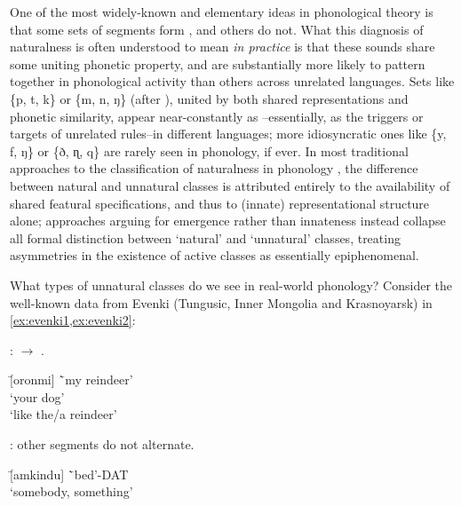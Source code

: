 One of the most widely-known and elementary ideas in phonological theory is that some sets of segments form , and others do not. What this diagnosis of naturalness is often understood to mean \emph{in practice} is that these sounds share some uniting phonetic property, and are substantially more likely to pattern together in phonological activity than others across unrelated languages. Sets like \{p, t, k\} or \{m, n, ŋ\} (after \cite{Kenstowicz1979}), united by both shared representations and phonetic similarity, appear near-constantly as --essentially, as the triggers or targets of unrelated rules--in different languages; more idiosyncratic ones like \{y, f, ŋ\} or \{ð, ɳ, q\} are rarely seen in phonology, if ever. In most traditional approaches to the classification of naturalness in phonology \citep{SPE}, the difference between natural and unnatural classes is attributed entirely to the availability of shared featural specifications, and thus to (innate) representational structure alone; approaches arguing for emergence rather than innateness \citep{Flemming2005,Mielke2008} instead collapse all formal distinction between `natural' and `unnatural' classes, treating asymmetries in the existence of active classes as essentially epiphenomenal.

What types of unnatural classes do we see in real-world phonology? Consider the well-known data from Evenki (Tungusic, Inner Mongolia and Krasnoyarsk) in \cref{ex:evenki1,ex:evenki2}:

\begin{minipage}[t]{\linewidth}
\begin{example}\label{ex:evenki1} :  $\rightarrow$ . \citep{Nedjalkov1997}
\begin{tabbing}

         \tab[2cm] \= [oronmi] \tab[2cm] \= `my reindeer'\\
         \tab[2cm] \> [ŋinakinni] \tab[2cm] \> `your dog' \\
         \tab[2cm]  \tab[2cm] \> `like the/a reindeer'
    \end{tabbing}
\end{example}

\begin{example}\label{ex:evenki2} : other segments do not alternate. \citep{Nedjalkov1997}
\begin{tabbing}

         \tab[2cm] \= [amkindu] \tab[2cm] \= `bed'-{\sc\scriptsize DAT}\\
         \tab[2cm] \> [ekunda] \tab[2cm] \> `somebody, something'\\
    \end{tabbing}
\end{example}
\end{minipage}

